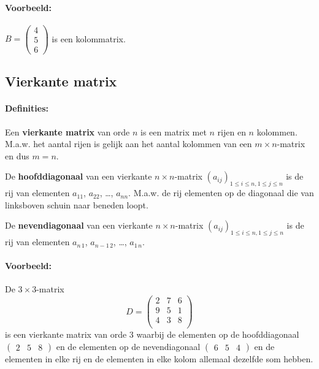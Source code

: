 \documentclass[12pt,twoside]{article}
\begin{document}
\paragraph*{Voorbeeld:}

$B=
\begin{pmatrix}
  4 \\ 5 \\ 6
\end{pmatrix}
$ is een kolommatrix.

\needspace{4cm}
\subsection{Vierkante matrix}

\paragraph*{Definities:}\mbox{}

Een {\bf vierkante matrix} van orde $n$ is een matrix met $n$ rijen en $n$ kolommen. M.a.w. het aantal rijen is gelijk aan het aantal kolommen van een $m \times n$-matrix en dus $m=n$.

De {\bf hoofddiagonaal} van een vierkante $n \times n$-matrix $(a_{ij})_{1 \leq i \leq n , 1 \leq j \leq n}$ is de rij van elementen $a_{11}$, $a_{22}$, \ldots , $a_{nn}$. M.a.w. de rij elementen op de diagonaal die van linksboven schuin naar beneden loopt.

De {\bf nevendiagonaal} van een vierkante $n \times n$-matrix $(a_{ij})_{1 \leq i \leq n , 1 \leq j \leq n}$ is de rij van elementen $a_{n\,1}$, $a_{n-1\,2}$, \ldots , $a_{1\,n}$.

\paragraph*{Voorbeeld:}

De $3 \times 3$-matrix
$$D=
\begin{pmatrix}
  2 & 7 & 6\\
  9 & 5 & 1\\
  4 & 3 & 8\\
\end{pmatrix}
$$
is een vierkante matrix van orde $3$ waarbij de elementen op de hoofddiagonaal
$\begin{pmatrix}2 & 5 & 8\end{pmatrix}$
en de elementen op de nevendiagonaal
$\begin{pmatrix}6 & 5 & 4\end{pmatrix}$
en de elementen in elke rij en de elementen in elke kolom allemaal dezelfde som hebben.
\end{document}
